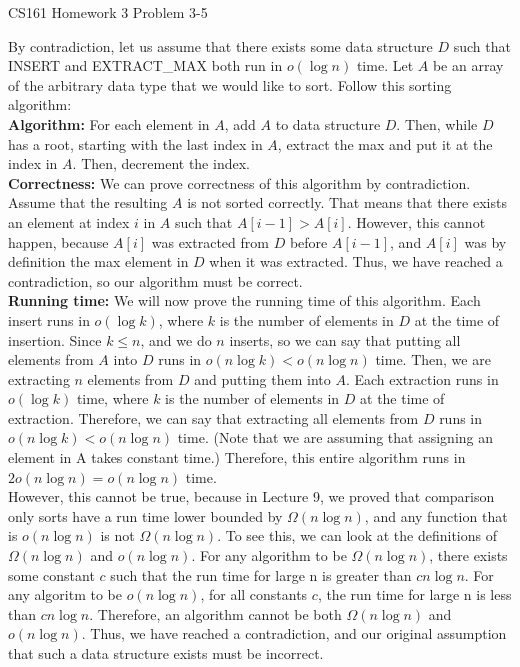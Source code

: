 \documentclass[12pt]{article}
\begin{document}
\begin{center}
{\Large CS161 Homework 3 Problem 3-5}

\end{center}

By contradiction, let us assume that there exists some data structure $D$ such that INSERT and EXTRACT\_MAX both run in $o(\log n)$ time. Let $A$ be an array of the arbitrary data type that we would like to sort. Follow this sorting algorithm:\\
\textbf{Algorithm:} For each element in $A$, add $A$ to data structure $D$. 
Then, while $D$ has a root, starting with the last index in $A$, extract the max and put it at the index in $A$. Then, decrement the index. \\
\textbf{Correctness:} We can prove correctness of this algorithm by contradiction. Assume that the resulting $A$ is not sorted correctly. That means that there exists an element at index $i$ in $A$ such that $A[i-1] > A[i]$. However, this cannot happen, because $A[i]$ was extracted from $D$ before $A[i-1]$, and $A[i]$ was by definition the max element in $D$ when it was extracted. Thus, we have reached a contradiction, so our algorithm must be correct.\\
\textbf{Running time:} We will now prove the running time of this algorithm. Each insert runs in $o(\log k)$, where $k$ is the number of elements in $D$ at the time of insertion. Since $k \le n$, and we do $n$ inserts, so we can say that putting all elements from $A$ into $D$ runs in $o(n \log k) < o(n \log n)$ time. Then, we are extracting $n$ elements from $D$ and putting them into $A$. Each extraction runs in $o(\log k)$ time, where $k$ is the number of elements in $D$ at the time of extraction. Therefore, we can say that extracting all elements from $D$ runs in $o(n \log k) < o(n \log n)$ time. (Note that we are assuming that assigning an element in A takes constant time.) Therefore, this entire algorithm runs in $2o(n \log n) = o(n \log n)$ time.\\ 
However, this cannot be true, because in Lecture 9, we proved that comparison only sorts have a run time lower bounded by $\Omega(n \log n)$, and any function that is $o(n \log n)$ is not $\Omega(n \log n)$. To see this, we can look at the definitions of $\Omega(n \log n)$ and $o(n \log n)$. For any algorithm to be $\Omega(n \log n)$, there exists some constant $c$ such that the run time for large n is greater than $cn \log n$. For any algoritm to be $o(n \log n)$, for all constants $c$, the run time for large n is less than $cn \log n$. Therefore, an algorithm cannot be both $\Omega(n \log n)$ and $o(n \log n)$. Thus, we have reached a contradiction, and our original assumption that such a data structure exists must be incorrect. 
\end{document}

